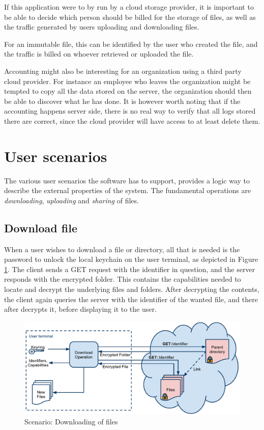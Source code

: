 \documentclass[pdftex,english,10pt,b5paper,twoside]{book}
\begin{document}
If this application were to by run by a cloud storage provider, it is
important to be able to decide which person should be billed for the storage of
files, as well as the traffic generated by users uploading and downloading
files. 

For an immutable file, this can be identified by the user who created the file,
and the traffic is billed on whoever retrieved or uploaded the file.

Accounting might also be interesting for an organization using a third party
cloud provider. For instance an employee who leaves the organization might be
tempted to copy all the data stored on the server, the organization should then
be able to discover what he has done. It is however worth noting that if the
accounting happens server side, there is no real way to verify that all logs
stored there are correct, since the cloud provider will have access to at least
delete them.

\section{User scenarios}

The various user scenarios the software has to support, provides a logic way to
describe the external properties of the system. The fundamental operations are
\emph{downloading}, \emph{uploading} and \emph{sharing} of files.

\subsection{Download file}

When a user wishes to download a file or directory, all that is needed is the
password to unlock the local keychain on the user terminal, as depicted in Figure
\ref{fig:AS:download}. The client sends a GET request with the identifier in
question, and the server responds with the encrypted folder. This contains the
capabilities needed to locate and decrypt the underlying files and folders.
After decrypting the contents, the client again queries the server with the
identifier of the wanted file, and there after decrypts it, before displaying it
to the user.

\begin{figure}[h!]
    \centering
    \includegraphics[width=\columnwidth]{ArchitectureDownload.pdf}
    \caption{Scenario: Downloading of files}
    \label{fig:AS:download}
\end{figure}
\end{document}
